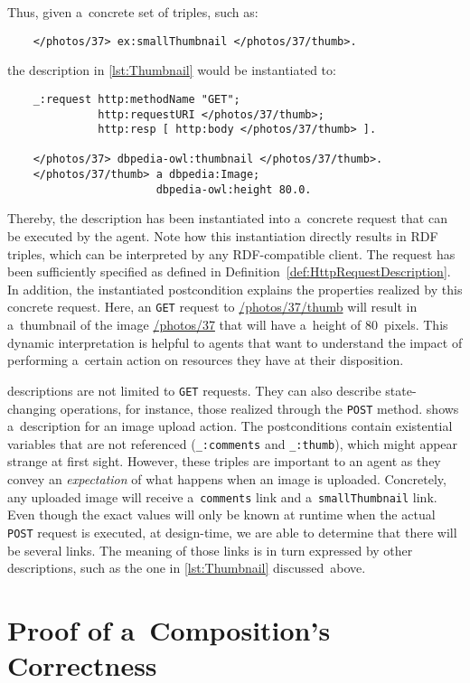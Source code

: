 Thus, given a~concrete set of triples, such as:
\begin{Verbatim}
    </photos/37> ex:smallThumbnail </photos/37/thumb>.
\end{Verbatim}
the description in \cref{lst:Thumbnail} would be instantiated to: 
\begin{Verbatim}
    _:request http:methodName "GET";
              http:requestURI </photos/37/thumb>;
              http:resp [ http:body </photos/37/thumb> ].

    </photos/37> dbpedia-owl:thumbnail </photos/37/thumb>.
    </photos/37/thumb> a dbpedia:Image;
                       dbpedia-owl:height 80.0.
\end{Verbatim}
Thereby, the description has been instantiated into a~concrete \http request
that can be executed by the agent.
Note how this instantiation directly results in RDF triples,
which can be interpreted by any RDF-compatible client.
The request has been sufficiently specified
as defined in Definition~\ref{def:HttpRequestDescription}.
In addition, the instantiated postcondition
explains the properties realized by this concrete request.
Here, an \http \verb!GET! request to \url{/photos/37/thumb}
will result in a~thumbnail of the image \url{/photos/37}
that will have a~height of 80~pixels.
This dynamic interpretation is helpful to agents
that want to understand the impact
of performing a~certain action on resources they have at their disposition.

\restdesc descriptions are not limited to \verb!GET! requests.
They can also describe state-changing operations,
for instance, those realized through the \verb!POST! method.
 shows a~description for an image upload action.
The postconditions contain existential variables that are not referenced
(\verb!_:comments! and \verb!_:thumb!),
which might appear strange at first sight.
However, these triples are important to an agent
as they convey an \emph{expectation} of what happens when an image is uploaded.
Concretely, any uploaded image will receive a~\verb!comments! link
and a~\verb!smallThumbnail! link.
Even though the exact values will only be known at runtime
when the actual \verb!POST! request is executed,
at design-time, we are able to determine that there will be several links.
The meaning of those links is in turn expressed by other descriptions,
such as the one in \cref{lst:Thumbnail} discussed~above.

\section{Proof of a~Composition's Correctness}
\label{sec:Proof}

